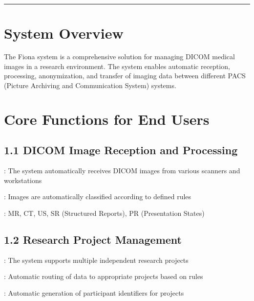 \documentclass[letterpaper,10pt,english]{sphinxmanual}
\begin{document}
\bigskip\hrule\bigskip



\section{System Overview}
\label{\detokenize{Temp/end-user-options:system-overview}}
\sphinxAtStartPar
The Fiona system is a comprehensive solution for managing DICOM medical images in a research environment. The system enables automatic reception, processing, anonymization, and transfer of imaging data between different PACS (Picture Archiving and Communication System) systems.


\section{Core Functions for End Users}
\label{\detokenize{Temp/end-user-options:core-functions-for-end-users}}

\subsection{1.1 DICOM Image Reception and Processing}
\label{\detokenize{Temp/end-user-options:dicom-image-reception-and-processing}}
\sphinxAtStartPar
{}: The system automatically receives DICOM images from various scanners and workstations

\sphinxAtStartPar
{}: Images are automatically classified according to defined rules

\sphinxAtStartPar
{}: MR, CT, US, SR (Structured Reports), PR (Presentation States)


\subsection{1.2 Research Project Management}
\label{\detokenize{Temp/end-user-options:research-project-management}}
\sphinxAtStartPar
{}: The system supports multiple independent research projects

\sphinxAtStartPar
{}: Automatic routing of data to appropriate projects based on rules

\sphinxAtStartPar
{}: Automatic generation of participant identifiers for projects
\end{document}
